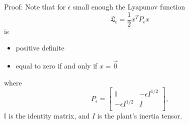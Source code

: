 \noindent Proof: 
%
Note that for $\epsilon$ small enough the Lyapunov function
%
\begin{equation}\label{chSMS_ID.eq.AVO_Lyap}
\mathfrak{L}_\epsilon =\frac{1}{2}x^T P_\epsilon x 
\end{equation}
%
is
%
\begin{itemize}
\item  positive definite
\item equal to zero if and only if $x =\vec{0}$
\end{itemize}
%
where 
%
\begin{equation}
P_\epsilon=
\left[ \begin{array}{cc}
     \mathbb{I}         & -\epsilon I^{1/2}  \\
     -\epsilon I^{1/2}  & I                  \\
\end{array} \right],
\end{equation}
%
$\mathbb{I}$ is the identity matrix, and $I$ is the plant's
inertia tensor.
% 

